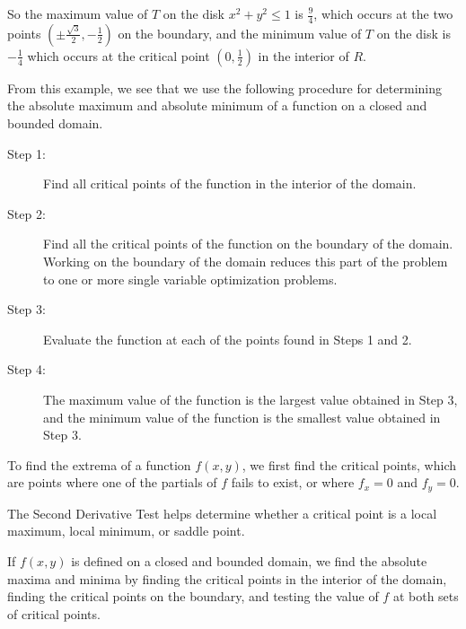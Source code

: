 \begin{example}
So the maximum value of $T$ on the disk $x^2+y^2\leq 1$ is
$\frac{9}{4}$, which occurs at 
the two points $\left(\pm\frac{\sqrt{3}}{2},-\frac{1}{2}\right)$ on
the boundary, and the minimum value of $T$ on the disk is $-\frac{1}{4}$
which occurs at the critical point $\left(0,\frac{1}{2}\right)$ in the
interior of $R$.

\end{example}

From this example, we see that we use the following procedure for determining the absolute maximum and absolute minimum of a function on a closed and bounded domain.
\begin{description}
\item[Step 1:] Find all critical points of the function in the interior of the domain.
\item[Step 2:] Find all the critical points of the function on the boundary of the domain. Working on the boundary of the domain reduces this part of the problem to one or more single variable optimization problems.
\item[Step 3:] Evaluate the function at each of the points found in Steps 1 and 2.
\item[Step 4:] The maximum value of the function is the largest value obtained in Step 3, and the minimum value of the function is the smallest value obtained in Step 3.
\end{description}



\newpage

\begin{summary}

\item To find the extrema of a function $f(x,y)$, we first find the
  critical points, which are points where one of the partials of $f$
  fails to exist, or where $f_x = 0$ and $f_y=0$.
\item The Second Derivative Test helps determine whether a critical
  point is a local maximum, local minimum, or saddle point.
\item If $f(x,y)$ is defined on a closed and bounded domain, we find
  the absolute maxima and minima by finding the critical points in the
  interior of the domain, finding the critical points on the boundary,
  and testing the value of $f$ at both sets of critical points.

\end{summary}


\nin \hrulefill



\clearpage
